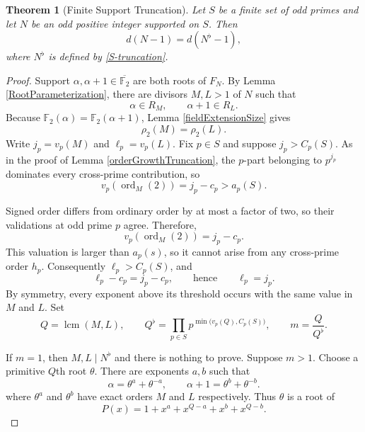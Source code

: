 \documentclass[a4paper]{article}
\newtheorem{theorem}{Theorem}[section]
\newcommand{\F}{\mathbb{F}}
\newcommand{\ord}[2][]{\operatorname{ord}_{#1}\!\left( #2 \right)}
\begin{document}
	\begin{theorem}[Finite Support Truncation]\label{finiteSupportTruncation}
		Let $S$ be a finite set of odd primes and let $N$ be an odd positive integer supported on $S$.
		Then
		\begin{equation*}
			d(N - 1) = d(N^\flat - 1),
		\end{equation*}
		where $N^\flat$ is defined by \eqref{S-truncation}.
	\end{theorem}
	\begin{proof}
		Support $\alpha, \alpha+1 \in \overline{\F_2}$ are both roots of $F_N$.
		By Lemma \ref{RootParameterization}, there are divisors $M,L > 1$ of $N$ such that
		\begin{equation*}
			\alpha \in R_M, \qquad \alpha+1 \in R_L.
		\end{equation*}
		Because $\F_2(\alpha) = \F_2(\alpha+1)$, Lemma \ref{fieldExtensionSize} gives
		\begin{equation*}
			\rho_2(M) = \rho_2(L).
		\end{equation*}
		Write $j_p = v_p(M)$ and $\ell_p = v_p(L)$.
		Fix $p \in S$ and suppose $j_p > C_p(S)$.
		As in the proof of Lemma \ref{orderGrowthTruncation}, the $p$-part belonging to $p^{j_p}$ dominates every cross-prime contribution, so
		\begin{equation*}
			v_p(\ord[M]{2}) = j_p - c_p > a_p(S).
		\end{equation*}
	
		Signed order differs from ordinary order by at most a factor of two, so their validations at odd prime $p$ agree.
		Therefore,
		\begin{equation*}
			v_p(\ord[M]{2}) = j_p - c_p.
		\end{equation*}
		This valuation is larger than $a_p(s)$, so it cannot arise from any cross-prime order $h_p$.
		Consequently $\ell_p > C_p(S)$, and
		\begin{equation*}
			\ell_p - c_p = j_p - c_p, \qquad \text{hence} \qquad \ell_p = j_p.
		\end{equation*}
		By symmetry, every exponent above its threshold occurs with the same value in $M$ and $L$.
		Set
		\begin{equation*}
			Q = \operatorname{lcm}(M,L), \qquad Q^\flat = \prod_{p \in S}{p^{\min{(v_p(Q),C_p(S)})}}, \qquad m = \frac{Q}{Q^\flat}.
		\end{equation*}
	
		If $m=1$, then $M,L \mid N^\flat$ and there is nothing to prove.
		Suppose $m > 1$.
		Choose a primitive $Q$th root $\theta$.
		There are exponents $a,b$ such that
		\begin{equation*}
			\alpha = \theta^{a} + \theta^{-a}, \qquad \alpha+1 = \theta^{b}+\theta^{-b}.
		\end{equation*}
		where $\theta^a$ and $\theta^b$ have exact orders $M$ and $L$ respectively.
		Thus $\theta$ is a root of
		\begin{equation}\label{thetaRoot}
			P(x) = 1 + x^a + x^{Q-a} + x^b + x^{Q-b}.
		\end{equation}
	

\end{proof}
\end{document}
